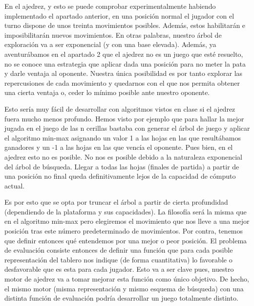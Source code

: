 \documentclass[letterpaper,12pt]{article}
\begin{document}
En el ajedrez, y esto se puede comprobar experimentalmente habiendo implementado el
apartado anterior, en una posición normal el jugador con el turno dispone de unos treinta
movimientos posibles. Además, estos habilitarán e imposibilitarán nuevos movimientos.
En otras palabras, nuestro árbol de exploración va a ser exponencial (y con una base
elevada). Además, ya aventurábamos en el apartado 2 que el ajedrez no es un juego que 
esté resuelto, no se conoce una estrategia que aplicar dada una posición para no meter
la pata y darle ventaja al oponente. Nuestra única posibilidad es por tanto explorar
las repercusiones de cada movimiento y quedarnos con el que nos permita obtener una 
cierta ventaja o, ceder lo mínimo posible ante nuestro oponente.

Esto sería muy fácil de desarrollar con algoritmos vistos en clase si el ajedrez fuera
mucho menos profundo. Hemos visto por ejemplo que para hallar la mejor jugada en el juego
de las n cerillas bastaba con generar el árbol de juego y aplicar el algoritmo min-max
asignando un valor 1 a las hojas en las que resultábamos ganadores y un -1 a las hojas en
las que vencía el oponente. Pues bien, en el ajedrez esto no es posible. No nos es posible
debido a la naturaleza exponencial del árbol de búsqueda. Llegar a todas las hojas (finales
de partida) a partir de una posición no final queda definitivamente lejos de 
la capacidad de cómputo actual.

Es por esto que se opta por truncar el árbol a partir de cierta profundidad (dependiendo
de la plataforma y sus capacidades). La filosofía será la misma que en el algoritmo min-max
pero elegiremos el movimiento que nos lleve a una mejor posición tras este número 
predeterminado de movimientos. Por contra, tenemos que definir entonces qué entendemos por 
una mejor o peor posición. El problema de evaluación consiste entonces de definir una 
función que para cada posible representación del tablero nos indique (de forma
cuantitativa) lo favorable o desfavorable que es esta para cada jugador. Esto va a ser 
clave pues, nuestro motor de ajedrez va a tomar mejorar esta función como único objetivo. 
De hecho, el mismo motor (misma representación y mismo esquema de búsqueda) con una 
distinta función de evaluación podría desarrollar un juego totalmente distinto. 
\end{document}
